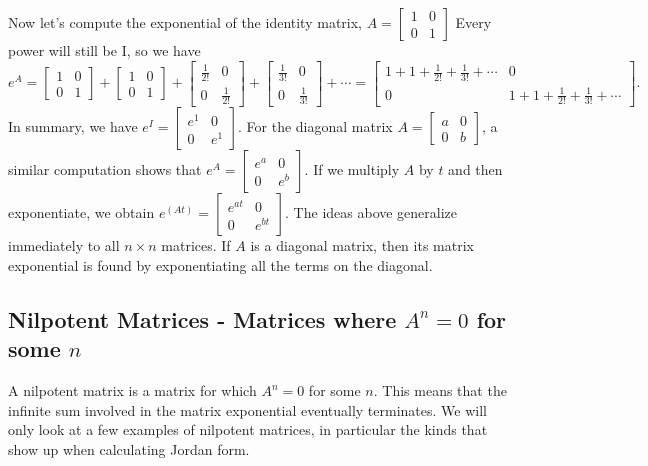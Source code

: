 Now let's compute the exponential of the identity matrix, $A=
\begin{bmatrix}
 1 & 0 \\
 0 & 1
\end{bmatrix}
$
Every power will still be I, so we have 
$$e^A = 
\begin{bmatrix}
 1 & 0 \\
 0 & 1
\end{bmatrix}
+
\begin{bmatrix}
 1 & 0 \\
 0 & 1
\end{bmatrix}
+
\begin{bmatrix}
 \frac{1}{2!} & 0 \\
 0 & \frac{1}{2!}
\end{bmatrix}
+
\begin{bmatrix}
 \frac{1}{3!} & 0 \\
 0 & \frac{1}{3!}
\end{bmatrix}
+\cdots = 
\begin{bmatrix}
 1+1+\frac{1}{2!}+\frac{1}{3!}+\cdots & 0 \\
 0 & 1+1+\frac{1}{2!}+\frac{1}{3!}+\cdots
\end{bmatrix}
.$$
In summary, we have $e^I = 
\begin{bmatrix}
 e^1 & 0 \\
 0 & e^1
\end{bmatrix}
$. For the diagonal matrix 
$A=
\begin{bmatrix}
 a & 0 \\
 0 & b
\end{bmatrix}
$, a similar computation shows that $e^{A} = 
\begin{bmatrix}
 e^a & 0 \\
 0 & e^b
\end{bmatrix}
.$  If we multiply $A$ by $t$ and then exponentiate, we obtain 
$e^(At) = 
\begin{bmatrix}
 e^{at} & 0 \\
 0 & e^{bt}
\end{bmatrix}
.$ 
The ideas above generalize immediately to all $n\times n$ matrices. If $A$ is a diagonal matrix, then its matrix exponential is found by exponentiating all the terms on the diagonal.  



\subsection{Nilpotent Matrices - Matrices where $A^n=0$ for some $n$}
A nilpotent matrix is a matrix for which $A^n=0$ for some $n$. This means that the infinite sum involved in the matrix exponential eventually terminates. We will only look at a few examples of nilpotent matrices, in particular the kinds that show up when calculating Jordan form. 

